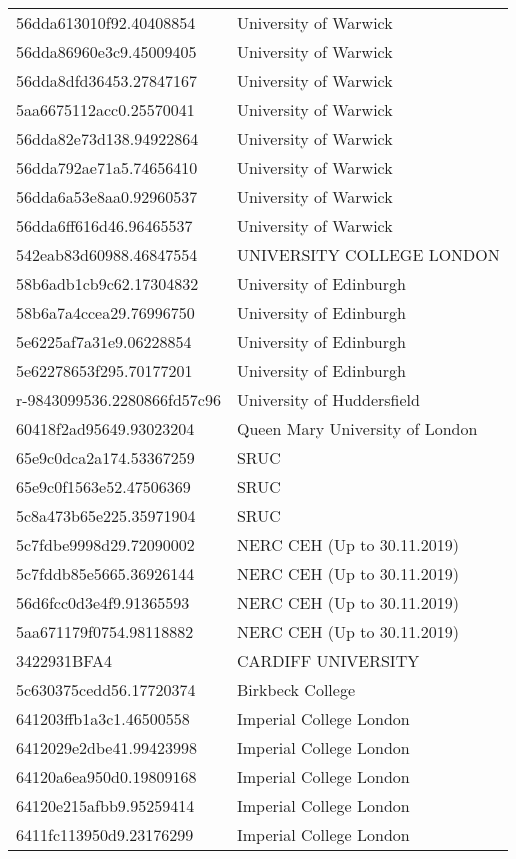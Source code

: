 \begin{tabular}{ll}
56dda613010f92.40408854 & University of Warwick \\
56dda86960e3c9.45009405 & University of Warwick \\
56dda8dfd36453.27847167 & University of Warwick \\
5aa6675112acc0.25570041 & University of Warwick \\
56dda82e73d138.94922864 & University of Warwick \\
56dda792ae71a5.74656410 & University of Warwick \\
56dda6a53e8aa0.92960537 & University of Warwick \\
56dda6ff616d46.96465537 & University of Warwick \\
542eab83d60988.46847554 & UNIVERSITY COLLEGE LONDON \\
58b6adb1cb9c62.17304832 & University of Edinburgh \\
58b6a7a4ccea29.76996750 & University of Edinburgh \\
5e6225af7a31e9.06228854 & University of Edinburgh \\
5e62278653f295.70177201 & University of Edinburgh \\
r-9843099536.2280866fd57c96 & University of Huddersfield \\
60418f2ad95649.93023204 & Queen Mary University of London \\
65e9c0dca2a174.53367259 & SRUC \\
65e9c0f1563e52.47506369 & SRUC \\
5c8a473b65e225.35971904 & SRUC \\
5c7fdbe9998d29.72090002 & NERC CEH (Up to 30.11.2019) \\
5c7fddb85e5665.36926144 & NERC CEH (Up to 30.11.2019) \\
56d6fcc0d3e4f9.91365593 & NERC CEH (Up to 30.11.2019) \\
5aa671179f0754.98118882 & NERC CEH (Up to 30.11.2019) \\
3422931BFA4 & CARDIFF UNIVERSITY \\
5c630375cedd56.17720374 & Birkbeck College \\
641203ffb1a3c1.46500558 & Imperial College London \\
6412029e2dbe41.99423998 & Imperial College London \\
64120a6ea950d0.19809168 & Imperial College London \\
64120e215afbb9.95259414 & Imperial College London \\
6411fc113950d9.23176299 & Imperial College London \\

\end{tabular}
